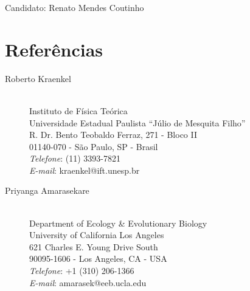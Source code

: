 \documentclass[12pt]{article}
\begin{document}
\thispagestyle{empty}

{\huge
Candidato:  Renato Mendes Coutinho
}

\section*{Referências}

\begin{description}

\item[Roberto Kraenkel]~\\
Instituto de Física Teórica\\
Universidade Estadual Paulista ``Júlio de Mesquita Filho''\\
R. Dr. Bento Teobaldo Ferraz, 271 - Bloco II\\
01140-070 - São Paulo, SP - Brasil\\
\emph{Telefone}: (11) 3393-7821\\
\emph{E-mail}: {\sf kraenkel@ift.unesp.br}

\item[Priyanga Amarasekare]~\\
Department of Ecology \& Evolutionary Biology\\
University of California Los Angeles\\
621 Charles E. Young Drive South\\
90095-1606 - Los Angeles, CA - USA\\
\emph{Telefone}: +1 (310) 206-1366 \\
\emph{E-mail}: {\sf amarasek@eeb.ucla.edu}

\end{description}
\end{document}
